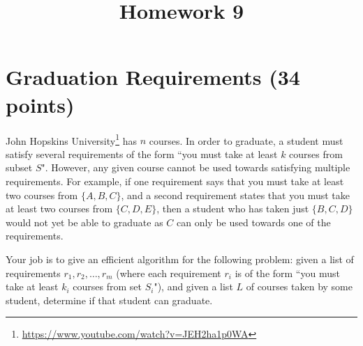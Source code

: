 \documentclass{article}
\begin{document}
\title{Homework 9}
\maketitle
\thispagestyle{fancy}

\section{Graduation Requirements (34 points)}

John Hopskins University\footnote{\url{https://www.youtube.com/watch?v=JEH2ha1p0WA}} has $n$ courses.  In order to graduate, a student must satisfy several requirements of the form ``you must take at least $k$ courses from subset $S$".  However, any given course cannot be used towards satisfying multiple requirements.  For example, if one requirement says that you must take at least two courses from $\{A, B, C\}$, and a second requirement states that you must take at least two courses from $\{C, D, E\}$, then a student who has taken just $\{B, C, D\}$ would not yet be able to graduate as $C$ can only be used towards one of the requirements.  

Your job is to give an efficient algorithm for the following problem: given a list of requirements $r_1, r_2, \dots, r_m$ (where each requirement $r_i$ is of the form ``you must take at least $k_i$ courses from set $S_i$"), and given a list $L$ of courses taken by some student, determine if that student can graduate.  
\end{document}

